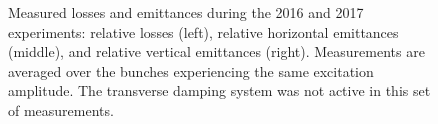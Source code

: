 \documentclass[%
 reprint,
 amsmath,amssymb,
 aps,
prstab,
longbibliography
]{revtex4-1}
\begin{document}
\begin{figure}
\begin{tabular}{ccc}
  \end{tabular}
  \caption{Measured losses and emittances during the 2016 and 2017
    experiments: relative losses (left), relative horizontal
    emittances (middle), and relative vertical emittances
    (right). Measurements are averaged over the bunches experiencing
    the same excitation amplitude. The transverse damping system was
    not active in this set of measurements.}
  \label{fig:7thexp}
\end{figure}

\end{document}
